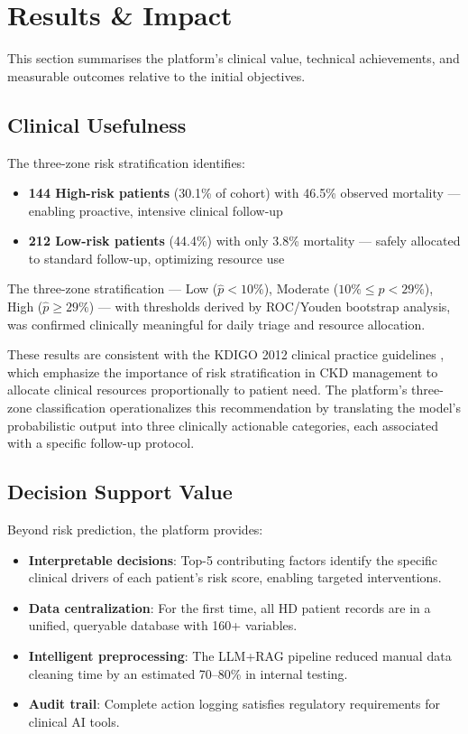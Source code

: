 \documentclass[12pt,a4paper,twoside]{report}
\begin{document}
\section{Results \& Impact}\label{sec:impact}

This section summarises the platform's clinical value, technical achievements, and measurable outcomes relative to the initial objectives.

\subsection{Clinical Usefulness}

The three-zone risk stratification identifies:
\begin{itemize}
  \item \textbf{144 High-risk patients} (30.1\% of cohort) with 46.5\% observed mortality — enabling proactive, intensive clinical follow-up
  \item \textbf{212 Low-risk patients} (44.4\%) with only 3.8\% mortality — safely allocated to standard follow-up, optimizing resource use
\end{itemize}

The three-zone stratification — Low ($\hat{p}<10\%$), Moderate ($10\%\leq\hat{p}<29\%$), High ($\hat{p}\geq29\%$) — with thresholds derived by ROC/Youden bootstrap analysis, was confirmed clinically meaningful for daily triage and resource allocation.

These results are consistent with the KDIGO 2012 clinical practice guidelines \cite{kdigo2015}, which emphasize the importance of risk stratification in CKD management to allocate clinical resources proportionally to patient need. The platform's three-zone classification operationalizes this recommendation by translating the model's probabilistic output into three clinically actionable categories, each associated with a specific follow-up protocol.

\subsection{Decision Support Value}\label{sec:decision_support}

Beyond risk prediction, the platform provides:
\begin{itemize}
  \item \textbf{Interpretable decisions}: Top-5 contributing factors identify the specific clinical drivers of each patient's risk score, enabling targeted interventions.
  \item \textbf{Data centralization}: For the first time, all HD patient records are in a unified, queryable database with 160+ variables.
  \item \textbf{Intelligent preprocessing}: The LLM+RAG pipeline reduced manual data cleaning time by an estimated 70--80\% in internal testing.
  \item \textbf{Audit trail}: Complete action logging satisfies regulatory requirements for clinical AI tools.
\end{itemize}
\end{document}
